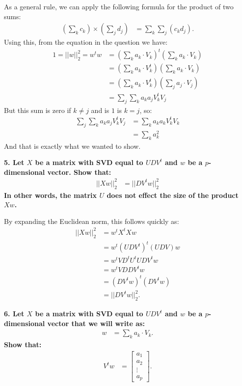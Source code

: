 \documentclass[12pt,hidelinks]{article}
\numberwithin{equation}{section}
\begin{document}
As a general rule, we can apply the following formula for the product of two
sums:
\begin{align}
\left(\sum_k c_k\right) \times \left(\sum_j d_j \right) &= \sum_k \sum_j (c_k d_j).
\end{align}
Using this, from the equation in the question we have:
\begin{align}
1 = || w ||_2^2 = w^t w &= \left(\sum_k a_k \cdot V_k \right)^t \left(\sum_k a_k \cdot V_k \right) \\
&= \left(\sum_k a_k \cdot V_k^t \right) \left(\sum_k a_k \cdot V_k \right) \\
&= \left(\sum_k a_k \cdot V_k^t \right) \left(\sum_j a_j \cdot V_j \right) \\
&= \sum_j \sum_k a_k a_j V_k^t V_j
\end{align}
But this sum is zero if $k\neq j$ and is $1$ is $k=j$, so:
\begin{align}
\sum_j \sum_k a_k a_j V_k^t V_j &= \sum_k a_k a_k V_k^t V_k \\
&= \sum_k a_k^2
\end{align}
And that is exactly what we wanted to show.

\vspace*{12pt}

\textbf{5. Let $X$ be a matrix with SVD equal to $UDV^t$ and $w$ be a
$p$-dimensional vector. Show that:
\begin{align}
|| X w ||_2^2 &= || D V^t w ||_2^2
\end{align}
In other words, the matrix $U$ does not effect the size of the product $X w$.}

\vspace*{12pt}

By expanding the Euclidean norm, this follows quickly as:
\begin{align}
|| X w ||_2^2 &= w^t X^t X w\\
&= w^t (U D V^t)^t (U D V) w \\
&= w^t V D^t U^t U D V^t w \\
&= w^t V D D V^t w \\
&= (D V^t w)^t (D V^t w) \\
&= ||D V^t w ||_2^2.
\end{align}

\vspace*{12pt}

\textbf{6. Let $X$ be a matrix with SVD equal to $UDV^t$ and $w$ be a
$p$-dimensional vector that we will write as:}
\begin{align}
w &= \sum_k a_k \cdot V_k.
\end{align}
\textbf{Show that:}
\begin{align}
V^t w &= \begin{bmatrix} a_1 \\ a_2 \\ \vdots \\ a_p \end{bmatrix}.
\end{align}
\end{document}
